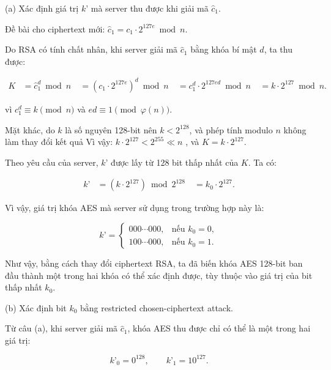 \begin{loigiai}

{(a) Xác định giá trị $k’$ mà server thu được khi giải mã $\hat{c}_1$.}

Đề bài cho ciphertext mới:
$
\hat{c}_1=c_1\cdot 2^{127e}\bmod n.
$

Do RSA có tính chất nhân, khi server giải mã $\hat{c}_1$ bằng khóa bí mật $d$, ta thu được:

$$
\begin{aligned}
K
&=\hat{c}_1^d\bmod n\
&=(c_1\cdot 2^{127e})^d\bmod n\
&=c_1^d\cdot 2^{127ed}\bmod n\
&=k\cdot 2^{127}\bmod n.
\end{aligned}
$$

vì $c_1^d\equiv k\pmod n$ và $ed\equiv 1\pmod{\varphi(n)}$.

Mặt khác, do $k$ là số nguyên 128-bit nên $k<2^{128}$, và phép tính modulo $n$ không làm thay đổi kết quả  Vì vậy:
$
k\cdot 2^{127}<2^{255}\ll n
$
, và
$
K=k\cdot 2^{127}.
$

Theo yêu cầu của server, $k’$ được lấy từ 128 bit thấp nhất của $K$. Ta có:

$$
\begin{aligned}
k’
&=(k\cdot 2^{127})\bmod 2^{128}\
&=k_0\cdot 2^{127}.
\end{aligned}
$$


Vì vậy, giá trị khóa AES mà server sử dụng trong trường hợp này là:

$$
\boxed{
k’=
\begin{cases}
000\cdots 000, & \text{nếu } k_0=0,\\
100\cdots 000, & \text{nếu } k_0=1.
\end{cases}
}
$$

Như vậy, bằng cách thay đổi ciphertext RSA, ta đã biến khóa AES 128-bit ban đầu thành một trong hai khóa có thể xác định được, tùy thuộc vào giá trị của bit thấp nhất $k_0$.

\bigskip

{(b) Xác định bit $k_0$ bằng restricted chosen-ciphertext attack.}

Từ câu (a), khi server giải mã $\hat{c}_1$, khóa AES thu được chỉ có thể là một trong hai giá trị:

$$
k’_0=0^{128},\qquad
k’_1=10^{127}.
$$


\end{loigiai}
